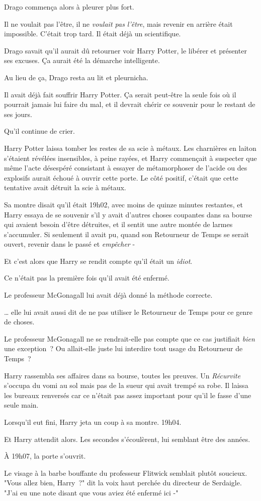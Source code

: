 Drago commença alors à pleurer plus fort.

Il ne voulait pas l'être, il ne \emph{voulait pas l'être}, mais revenir en arrière était impossible. C'était trop tard. Il était déjà un scientifique.

Drago savait qu'il aurait dû retourner voir Harry Potter, le libérer et présenter ses excuses. Ça aurait été la démarche intelligente.

Au lieu de ça, Drago resta au lit et pleurnicha.

Il avait déjà fait souffrir Harry Potter. Ça serait peut-être la seule fois où il pourrait jamais lui faire du mal, et il devrait chérir ce souvenir pour le restant de ses jours.

Qu'il continue de crier.

\later

Harry Potter laissa tomber les restes de sa scie à métaux. Les charnières en laiton s'étaient révélées insensibles, à peine rayées, et Harry commençait à suspecter que même l'acte désespéré consistant à essayer de métamorphoser de l'acide ou des explosifs aurait échoué à ouvrir cette porte. Le côté positif, c'était que cette tentative avait détruit la scie à métaux.

Sa montre disait qu'il était 19h02, avec moins de quinze minutes restantes, et Harry essaya de se souvenir s'il y avait d'autres choses coupantes dans sa bourse qui avaient besoin d'être détruites, et il sentit une autre montée de larmes s'accumuler. Si seulement il avait pu, quand son Retourneur de Temps se serait ouvert, revenir dans le passé et \emph{empêcher} -

Et c'est alors que Harry se rendit compte qu'il était un \emph{idiot}.

Ce n'était pas la première fois qu'il avait été enfermé.

Le professeur McGonagall lui avait déjà donné la méthode correcte.

… elle lui avait aussi dit de ne pas utiliser le Retourneur de Temps pour ce genre de choses.

Le professeur McGonagall ne se rendrait-elle pas compte que ce cas justifiait \emph{bien} une exception~? Ou allait-elle juste lui interdire tout usage du Retourneur de Temps~?

Harry rassembla ses affaires dans sa bourse, toutes les preuves. Un \emph{Récurvite} s'occupa du vomi au sol mais pas de la sueur qui avait trempé sa robe. Il laissa les bureaux renversés car ce n'était pas assez important pour qu'il le fasse d'une seule main.

Lorsqu'il eut fini, Harry jeta un coup à sa montre. 19h04.

Et Harry attendit alors. Les secondes s'écoulèrent, lui semblant être des années.

À 19h07, la porte s'ouvrit.

Le visage à la barbe bouffante du professeur Flitwick semblait plutôt soucieux. "Vous allez bien, Harry~?" dit la voix haut perchée du directeur de Serdaigle. "J'ai eu une note disant que vous aviez été enfermé ici -"~ 

